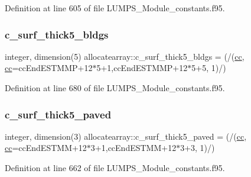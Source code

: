 Definition at line 605 of file L\+U\+M\+P\+S\+\_\+\+Module\+\_\+constants.\+f95.

\mbox{\label{namespaceallocatearray_aa1c4374aa923231385e3fa68751e42a0}} 
\subsubsection{\texorpdfstring{c\+\_\+surf\+\_\+thick5\+\_\+bldgs}{c\_surf\_thick5\_bldgs}}
{\footnotesize\ttfamily integer, dimension(5) allocatearray\+::c\+\_\+surf\+\_\+thick5\+\_\+bldgs = (/(\hyperlink{namespaceallocatearray_ac863c81704eb507dee10f5e10741e10c}{cc}, \hyperlink{namespaceallocatearray_ac863c81704eb507dee10f5e10741e10c}{cc}=cc\+End\+E\+S\+T\+M\+MP+12$\ast$5+1,cc\+End\+E\+S\+T\+M\+MP+12$\ast$5+5, 1)/)}



Definition at line 680 of file L\+U\+M\+P\+S\+\_\+\+Module\+\_\+constants.\+f95.

\mbox{\label{namespaceallocatearray_ad328a4dec64b7d341695bbd0dec3d28f}} 
\subsubsection{\texorpdfstring{c\+\_\+surf\+\_\+thick5\+\_\+paved}{c\_surf\_thick5\_paved}}
{\footnotesize\ttfamily integer, dimension(3) allocatearray\+::c\+\_\+surf\+\_\+thick5\+\_\+paved = (/(\hyperlink{namespaceallocatearray_ac863c81704eb507dee10f5e10741e10c}{cc}, \hyperlink{namespaceallocatearray_ac863c81704eb507dee10f5e10741e10c}{cc}=cc\+End\+E\+S\+T\+MM+12$\ast$3+1,cc\+End\+E\+S\+T\+MM+12$\ast$3+3, 1)/)}



Definition at line 662 of file L\+U\+M\+P\+S\+\_\+\+Module\+\_\+constants.\+f95.

\mbox{\label{namespaceallocatearray_abe5ad402b720ef5716ceb8120aca3611}} 
